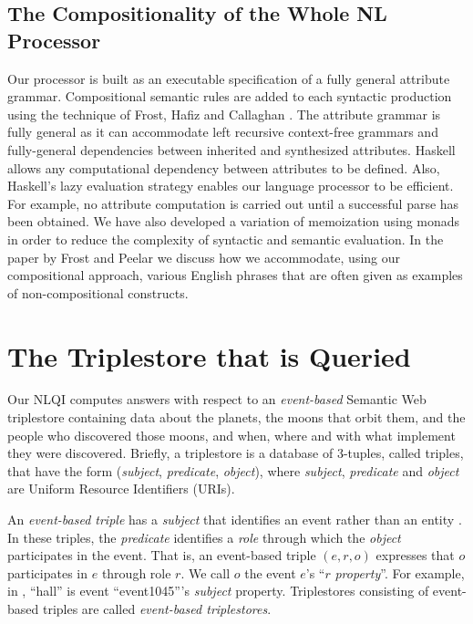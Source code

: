 \documentclass[../main.tex]{subfiles}
\begin{document}
\begin{refsection}
\subsection{The Compositionality of the Whole NL Processor}

Our processor is built as an executable specification of a fully general attribute grammar. Compositional semantic rules are added to each syntactic production using the technique of Frost, Hafiz and Callaghan \cite{frost2008parser}. The attribute grammar is fully general as it can accommodate left recursive context-free grammars and fully-general dependencies between inherited and synthesized attributes. Haskell allows any computational dependency between attributes to be defined. Also, Haskell’s lazy evaluation strategy enables our language processor to be efficient. For example, no attribute computation is carried out until a successful parse has been obtained. We have also developed a variation of memoization using monads \cite{frost2008parser} in order to reduce the complexity of syntactic and semantic evaluation.
In the paper by Frost and Peelar \cite{frostpeelar2019} we discuss how we accommodate, using our compositional approach, various English phrases that are often given as examples of non-compositional constructs.

\section{The Triplestore that is Queried}
\label{webist2019journal:triplestore}
Our NLQI computes answers with respect to an \textit{event-based} Semantic Web triplestore containing data about the planets, the moons that orbit them, and the people who discovered those moons, and when, where and with what implement they were discovered.  Briefly, a triplestore is a database of 3-tuples, called triples, that have the form (\textit{subject}, \textit{predicate}, \textit{object}), where \textit{subject}, \textit{predicate} and \textit{object} are Uniform Resource Identifiers (URIs).

An \textit{event-based triple} has a \textit{subject} that identifies an event rather than an entity \cite{peelar2016accommodating}. In these triples, the \textit{predicate} identifies a \textit{role} through which the \textit{object} participates in the event.  That is, an event-based triple $(e,r,o)$ expresses that $o$ participates in $e$ through role $r$.
We call $o$ the event $e$'s ``$r$ \textit{property}''. For example, in , ``hall'' is event ``event1045'''s \textit{subject} property. Triplestores consisting of event-based triples are called \textit{event-based triplestores}.


\end{refsection}
\end{document}
